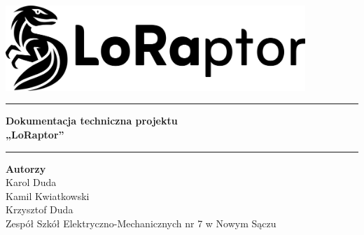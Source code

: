 \begin{titlepage}
\begin{center}

\vspace*{2cm}
\includegraphics[width=0.85\textwidth]{root/LoRaptor.png}\\[1cm]

\vspace{2cm}
\hrule
\vspace{0.5cm}
{\Huge \bfseries Dokumentacja techniczna projektu\\[0.2cm] „LoRaptor”}
\vspace{0.5cm}
\hrule

\vspace{1.5cm}
{\large \bfseries Autorzy}\\[1cm]

Karol Duda\\
Kamil Kwiatkowski\\
Krzysztof Duda\\

\vspace{3cm}
{\large Zespół Szkół Elektryczno-Mechanicznych nr 7 w Nowym Sączu}

\end{center}
\end{titlepage}
